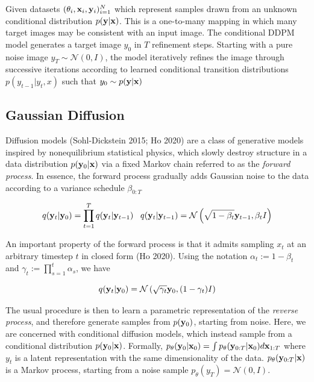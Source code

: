 \documentclass{article}
\begin{document}
Given datasets $(\theta_{i}, \bold{x}_i,\bold{y}_i)_{i=1}^{N}$ which represent samples drawn from an unknown conditional distribution $p(\bold{y}|\bold{x})$. This is a one-to-many mapping in which many target images may be consistent with an input image. The conditional DDPM model generates a target image $y_0$ in $T$ refinement steps. Starting with a pure noise image $y_{T}\sim \mathcal{N}(0,I)$, the model iteratively refines the image through successive iterations according to learned conditional transition distributions $p(y_{t-1}|y_{t},x)$ such that $y_{0} \sim p(\bold{y}|\bold{x})$ 

\subsection{Gaussian Diffusion}

Diffusion models (Sohl-Dickstein 2015; Ho 2020) are a class of generative models inspired by nonequilibrium statistical physics, which slowly destroy structure in a data distribution $p(\bold{y}_{0}|\bold{x})$ via a fixed Markov chain referred to as the \emph{forward process}. In essence, the forward process gradually adds Gaussian noise to the data according to a variance schedule $\beta_{0:T}$

\begin{equation}
q(\bold{y}_{t}|\bold{y}_{0}) = \prod_{t=1}^{T}q(\bold{y}_{t}|\bold{y}_{t-1}) \;\;\; q(\bold{y}_{t}|\bold{y}_{t-1}) = \mathcal{N}\left(\sqrt{1-\beta_{t}}\bold{y}_{t-1},\beta_t I\right)
\end{equation}

An important property of the forward process is that it admits sampling $x_t$ at an arbitrary timestep $t$ in closed form (Ho 2020). Using the notation $\alpha_t := 1 - \beta_t$ and $\gamma_t := \prod_{s=1}^{t} \alpha_s$, we have

\begin{equation}
q(\bold{y}_t|\bold{y}_0) = \mathcal{N} \left(\sqrt{\gamma_{t}} \bold{y}_{0}, (1 - \gamma_t)I \right)
\end{equation}


The usual procedure is then to learn a parametric representation of the \emph{reverse process}, and therefore generate samples from  $p(\bold{y}_{0})$, starting from noise. Here, we are concerned with conditional diffusion models, which  instead sample from a conditional distribution $p(\bold{y}_{0}|\bold{x})$. Formally, $p_{\theta}(\bold{y}_{0}|\bold{x}_{0}) = \int p_{\theta}(\bold{y}_{0:T}|\bold{x}_{0})d\bold{x}_{1:T}$ where $y_{t}$ is a latent representation with the same dimensionality of the data.  $p_{\theta}(\bold{y}_{0:T}|\bold{x})$ is a Markov process, starting from a noise sample $p_{\theta}(y_{T}) = \mathcal{N}(0,I)$. 
\end{document}
